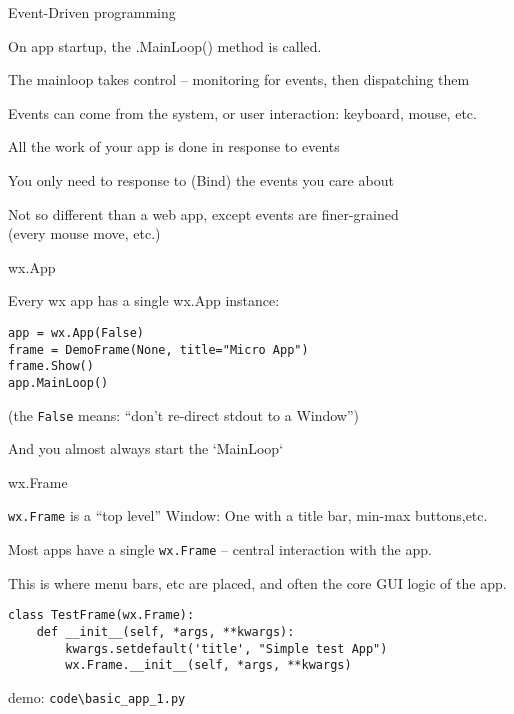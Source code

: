 \documentclass{beamer}
\begin{document}
\begin{frame}[fragile]{Event-Driven programming}

\vfill
{\Large On app startup, the .MainLoop() method is called.}

\vfill
{\Large The mainloop takes control -- monitoring for events, then dispatching them}

\vfill
{\Large Events can come from the system, or user interaction: keyboard, mouse, etc.}

\vfill
{\Large All the work of your app is done in response to events}

\vfill
{\Large You only need to response to (Bind) the events you care about}

\vfill
{\Large Not so different than a web app, except events are finer-grained}\\
(every mouse move, etc.)


\end{frame}


\begin{frame}[fragile]{wx.App}

\vfill
{\Large Every wx app has a single wx.App instance:}

\begin{verbatim}
app = wx.App(False)
frame = DemoFrame(None, title="Micro App")
frame.Show()
app.MainLoop()
\end{verbatim}

(the \verb`False` means: ``don't re-direct stdout to a Window'')

And you almost always start the `MainLoop`

\end{frame}

\begin{frame}[fragile]{wx.Frame}

\vfill
{\Large \verb`wx.Frame` is a ``top level'' Window: One with a title bar, min-max buttons,etc.}

\vfill
{\Large Most apps have a single \verb`wx.Frame` -- central interaction with the app.} 

\vfill
{\Large This is where menu bars, etc are placed, and often the core GUI logic of the app.} 


\begin{verbatim}
class TestFrame(wx.Frame):
    def __init__(self, *args, **kwargs):
        kwargs.setdefault('title', "Simple test App")
        wx.Frame.__init__(self, *args, **kwargs)
\end{verbatim}


\vfill
demo: \verb`code\basic_app_1.py`

\end{frame}
\end{document}
